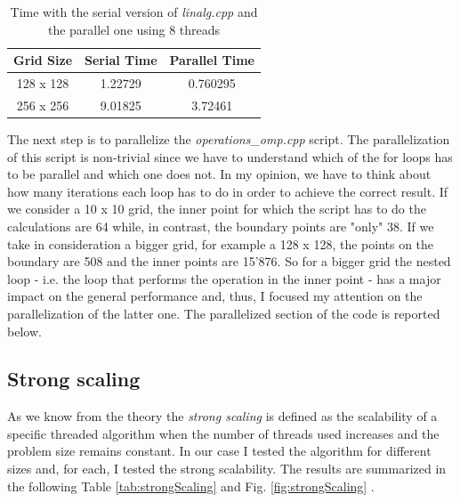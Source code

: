 \documentclass[unicode,11pt,a4paper,oneside,numbers=endperiod,openany]{scrartcl}
\begin{document}
\begin{table}[h!]
\begin{center}
	\begin{tabular}{|c|c|c|}
		\hline
		\textbf{Grid Size} & \textbf{Serial Time} & \textbf{Parallel Time}\\
		\hline\hline
		128 x 128 & 1.22729 & 0.760295  \\
		\hline
		256 x 256  & 9.01825 & 3.72461  \\
		\hline
	\end{tabular}
\end{center}
\caption{Time with the serial version of \textit{linalg.cpp} and the parallel one using 8 threads}\label{tab:linalgSP}
\end{table}

The next step is to parallelize the \textit{operations\_omp.cpp} script. The parallelization of this script is non-trivial since we have to understand which of the for loops has to be parallel and which one does not. In my opinion, we have to think about how many iterations each loop has to do in order to achieve the correct result. If we consider a 10 x 10 grid, the inner point for which the script has to do the calculations are 64 while, in contrast, the boundary points are "only" 38. If we take in consideration a bigger grid, for example a 128 x 128, the points on the boundary are 508 and the inner points are 15'876. So for a bigger grid the nested loop - i.e. the loop that performs the operation in the inner point - has a major impact on the general performance and, thus, I focused my attention on the parallelization of the latter one.
The parallelized section of the code is reported below.\\
 

\subsection{Strong scaling}
As we know from the theory the \textit{strong scaling} is defined as the scalability of a specific threaded algorithm when the number of threads used increases and the problem size remains constant. In our case I tested the algorithm for different sizes and, for each, I tested the strong scalability. The results are summarized in the following Table \ref{tab:strongScaling} and Fig. \ref{fig:strongScaling} .
\end{document}
